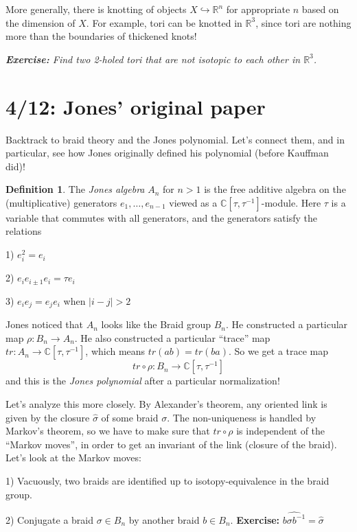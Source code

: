 \documentclass[11pt]{article}
\newcommand{\R}{\mathbb{R}}
\newcommand{\C}{\mathbb{C}}
\theoremstyle{plain}
\theoremstyle{definition}
\newtheorem{definition}{Definition}
\begin{document}
More generally, there is knotting of objects $X\hookrightarrow\R^n$ for appropriate $n$ based on the dimension of $X$. For example, tori can be knotted in $\R^3$, since tori are nothing more than the boundaries of thickened knots!

\textit{\textbf{Exercise:} Find two 2-holed tori that are not isotopic to each other in $\R^3$.}


\clearpage
\section{4/12: Jones' original paper}

Backtrack to braid theory and the Jones polynomial. Let's connect them, and in particular, see how Jones originally defined his polynomial (before Kauffman did)!

\begin{definition}
The \textit{Jones algebra} $A_n$ for $n>1$ is the free additive algebra on the (multiplicative) generators $e_1,\ldots,e_{n-1}$ viewed as a $\C[\tau,\tau^{-1}]$-module. Here $\tau$ is a variable that commutes with all generators, and the generators satisfy the relations

1) $e_i^2=e_i$

2) $e_ie_{i\pm 1}e_i=\tau e_i$

3) $e_ie_j=e_je_i$ when $|i-j|>2$
\end{definition}

Jones noticed that $A_n$ looks like the Braid group $B_n$. He constructed a particular map $\rho:B_n\to A_n$. He also constructed a particular ``trace'' map $tr:A_n\to\C[\tau,\tau^{-1}]$, which means $tr(ab)=tr(ba)$. So we get a trace map
$$tr\circ\rho:B_n\to\C[\tau,\tau^{-1}]$$
and this is the \textit{Jones polynomial} after a particular normalization!

\bigskip
Let's analyze this more closely. By Alexander's theorem, any oriented link is given by the closure $\hat\sigma$ of some braid $\sigma$. The non-uniqueness is handled by Markov's theorem, so we have to make sure that $tr\circ\rho$ is independent of the ``Markov moves'', in order to get an invariant of the link (closure of the braid). Let's look at the Markov moves:

1) Vacuously, two braids are identified up to isotopy-equivalence in the braid group.

2) Conjugate a braid $\sigma\in B_n$ by another braid $b\in B_n$. \textbf{Exercise:} $\widehat{b\sigma b^{-1}}=\hat\sigma$
\end{document}
